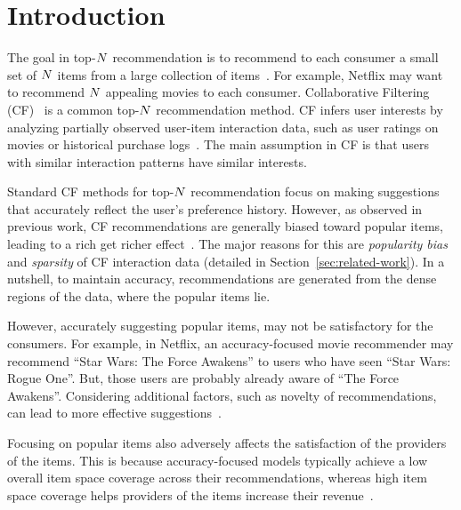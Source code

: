 \section{Introduction}
\label{sec:Introduction}


The goal in top-$N$ recommendation is to recommend to each
consumer a small set of $N$ items from a large collection of
items~\cite{cremonesi2010performance}.  For example, Netflix may want
to recommend $N$ appealing movies to each consumer.  Collaborative
Filtering (CF)~\cite{herlocker2002empirical,lee2012comparative} is a
common top-$N$ recommendation method.  CF infers user interests by
analyzing partially observed user-item interaction data, such as user
ratings on movies or historical purchase
logs~\cite{kanagal2012supercharging}. The main assumption in CF is that
users with similar interaction patterns have similar interests.


Standard CF methods for top-$N$ recommendation focus on making  suggestions  that accurately reflect the user's preference history. However, as  observed in previous work,  CF recommendations are generally biased toward  popular items, leading to a rich get richer effect~\cite{vargas2014improving,steck2011item}.  The major reasons for this are \textit{popularity bias} and \textit{sparsity} of CF interaction data (detailed in Section~\ref{sec:related-work}). In a nutshell, to maintain  accuracy, recommendations are generated from the dense regions of the data,  where the popular items lie.  

However,  accurately suggesting popular items, may not be satisfactory for the consumers. For example, in Netflix, an accuracy-focused movie recommender may recommend ``Star Wars: The Force Awakens'' to users who have seen ``Star Wars: Rogue One''.  But, those users are probably already aware of ``The Force Awakens''. Considering additional factors, such as novelty of recommendations,  can lead to more effective suggestions~\cite{cremonesi2010performance,Castells2015,zhang2008avoiding,ziegler2005improving,zhang2012auralist}. 

Focusing on popular items also adversely affects the satisfaction of  the providers of the items. This is because  accuracy-focused models typically achieve a  low overall item space coverage across their recommendations, whereas   high item space coverage helps providers of the items increase their revenue~\cite{vargas2014improving,Castells2015,adomavicius2011maximizing,anderson2006thelongtail, yin2012challenging,adomavicius2012improving}.

